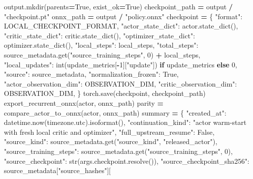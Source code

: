\documentclass[
  american,
  11pt,
  letterpaper,
]{article}
\newenvironment{Shaded}{\begin{snugshade}}{\end{snugshade}}
\newcommand{\BuiltInTok}[1]{#1}
\newcommand{\ControlFlowTok}[1]{\textcolor[rgb]{0.13,0.29,0.53}{\textbf{#1}}}
\newcommand{\DecValTok}[1]{\textcolor[rgb]{0.00,0.00,0.81}{#1}}
\newcommand{\NormalTok}[1]{#1}
\newcommand{\OperatorTok}[1]{\textcolor[rgb]{0.81,0.36,0.00}{\textbf{#1}}}
\newcommand{\StringTok}[1]{\textcolor[rgb]{0.31,0.60,0.02}{#1}}
\newcommand{\VariableTok}[1]{\textcolor[rgb]{0.00,0.00,0.00}{#1}}
\renewenvironment{Shaded}{\par\smallskip}{\par\smallskip}
\begin{document}
\begin{Shaded}
\begin{Highlighting}[]
\NormalTok{    output.mkdir(parents}\OperatorTok{=}\VariableTok{True}\NormalTok{, exist\_ok}\OperatorTok{=}\VariableTok{True}\NormalTok{)}
\NormalTok{    checkpoint\_path }\OperatorTok{=}\NormalTok{ output }\OperatorTok{/} \StringTok{"checkpoint.pt"}
\NormalTok{    onnx\_path }\OperatorTok{=}\NormalTok{ output }\OperatorTok{/} \StringTok{"policy.onnx"}
\NormalTok{    checkpoint }\OperatorTok{=}\NormalTok{ \{}
        \StringTok{"format"}\NormalTok{: LOCAL\_CHECKPOINT\_FORMAT,}
        \StringTok{"actor\_state\_dict"}\NormalTok{: actor.state\_dict(),}
        \StringTok{"critic\_state\_dict"}\NormalTok{: critic.state\_dict(),}
        \StringTok{"optimizer\_state\_dict"}\NormalTok{: optimizer.state\_dict(),}
        \StringTok{"local\_steps"}\NormalTok{: local\_steps,}
        \StringTok{"total\_steps"}\NormalTok{: source\_metadata.get(}\StringTok{"source\_training\_steps"}\NormalTok{, }\DecValTok{0}\NormalTok{) }\OperatorTok{+}\NormalTok{ local\_steps,}
        \StringTok{"local\_updates"}\NormalTok{: }\BuiltInTok{int}\NormalTok{(update\_metrics[}\OperatorTok{{-}}\DecValTok{1}\NormalTok{][}\StringTok{"update"}\NormalTok{]) }\ControlFlowTok{if}\NormalTok{ update\_metrics }\ControlFlowTok{else} \DecValTok{0}\NormalTok{,}
        \StringTok{"source"}\NormalTok{: source\_metadata,}
        \StringTok{"normalization\_frozen"}\NormalTok{: }\VariableTok{True}\NormalTok{,}
        \StringTok{"actor\_observation\_dim"}\NormalTok{: OBSERVATION\_DIM,}
        \StringTok{"critic\_observation\_dim"}\NormalTok{: OBSERVATION\_DIM,}
\NormalTok{    \}}
\NormalTok{    torch.save(checkpoint, checkpoint\_path)}
\NormalTok{    export\_recurrent\_onnx(actor, onnx\_path)}
\NormalTok{    parity }\OperatorTok{=}\NormalTok{ compare\_actor\_to\_onnx(actor, onnx\_path)}
\NormalTok{    summary }\OperatorTok{=}\NormalTok{ \{}
        \StringTok{"created\_at"}\NormalTok{: datetime.now(timezone.utc).isoformat(),}
        \StringTok{"continuation\_kind"}\NormalTok{: }\StringTok{"actor warm{-}start with fresh local critic and optimizer"}\NormalTok{,}
        \StringTok{"full\_upstream\_resume"}\NormalTok{: }\VariableTok{False}\NormalTok{,}
        \StringTok{"source\_kind"}\NormalTok{: source\_metadata.get(}\StringTok{"source\_kind"}\NormalTok{, }\StringTok{"released\_actor"}\NormalTok{),}
        \StringTok{"source\_training\_steps"}\NormalTok{: source\_metadata.get(}\StringTok{"source\_training\_steps"}\NormalTok{, }\DecValTok{0}\NormalTok{),}
        \StringTok{"source\_checkpoint"}\NormalTok{: }\BuiltInTok{str}\NormalTok{(args.checkpoint.resolve()),}
        \StringTok{"source\_checkpoint\_sha256"}\NormalTok{: source\_metadata[}\StringTok{"source\_hashes"}\NormalTok{][}

\end{Highlighting}
\end{Shaded}
\end{document}
